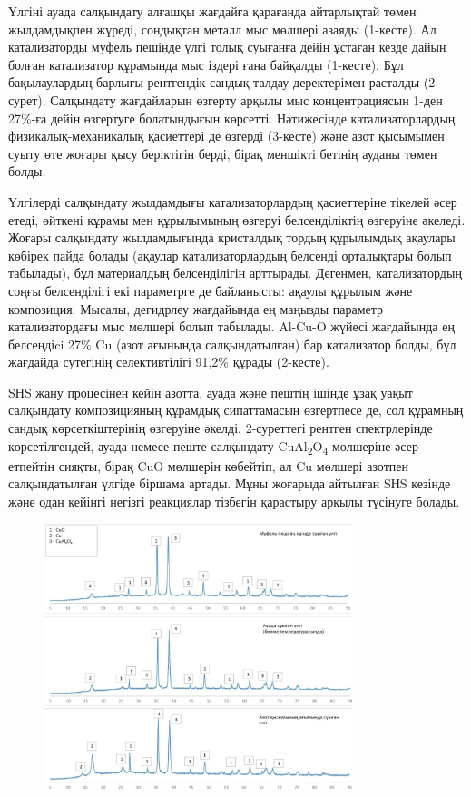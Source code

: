 Үлгіні ауада салқындату алғашқы жағдайға қарағанда айтарлықтай төмен
жылдамдықпен жүреді, сондықтан металл мыс мөлшері азаяды (1-кесте). Ал
катализаторды муфель пешінде үлгі толық суығанға дейін ұстаған кезде
дайын болған катализатор құрамында мыс іздері ғана байқалды (1-кесте).
Бұл бақылаулардың барлығы рентгендік-сандық талдау деректерімен расталды
(2-сурет). Салқындату жағдайларын өзгерту арқылы мыс концентрациясын
1-ден 27\%-ға дейін өзгертуге болатындығын көрсетті. Нәтижесінде
катализаторлардың физикалық-механикалық қасиеттері де өзгерді (3-кесте)
және азот қысымымен суыту өте жоғары қысу беріктігін берді, бірақ
меншікті бетінің ауданы төмен болды.

Үлгілерді салқындату жылдамдығы катализаторлардың қасиеттеріне тікелей
әсер етеді, өйткені құрамы мен құрылымының өзгеруі белсенділіктің
өзгеруіне әкеледі. Жоғары салқындату жылдамдығында кристалдық тордың
құрылымдық ақаулары көбірек пайда болады (ақаулар катализаторлардың
белсенді орталықтары болып табылады), бұл материалдың белсенділігін
арттырады. Дегенмен, катализатордың соңғы белсенділігі екі параметрге де
байланысты: ақаулы құрылым және композиция. Мысалы, дегидрлеу жағдайында
ең маңызды параметр катализатордағы мыс мөлшері болып табылады. Al-Cu-O
жүйесі жағдайында ең белсендіci 27\% Cu (азот ағынында салқындатылған)
бар катализатор болды, бұл жағдайда сутегінің селективтілігі 91,2\%
құрады (2-кесте).

SНS жану процесінен кейін азотта, ауада және пештің ішінде ұзақ уақыт
салқындату композицияның құрамдық сипаттамасын өзгертпесе де, сол
құрамның сандық көрсеткіштерінің өзгеруіне әкелді. 2-суреттегі рентген
спектрлерінде көрсетілгендей, ауада немесе пеште салқындату
CuAl\textsubscript{2}O\textsubscript{4} мөлшеріне әсер етпейтін сияқты,
бірақ CuO мөлшерін көбейтіп, ал Cu мөлшері азотпен салқындатылған үлгіде
біршама артады. Мұны жоғарыда айтылған SНS кезінде және одан кейінгі
негізгі реакциялар тізбегін қарастыру арқылы түсінуге болады.

\begin{figure}[H]
	\centering
	\includegraphics[width=0.8\textwidth]{assets/70}
	\caption*{}
\end{figure}

